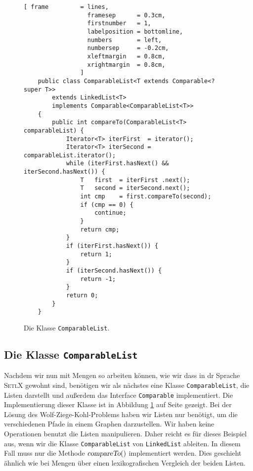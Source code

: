 \begin{figure}[!ht]
\centering
\begin{Verbatim}[ frame         = lines, 
                  framesep      = 0.3cm, 
                  firstnumber   = 1,
                  labelposition = bottomline,
                  numbers       = left,
                  numbersep     = -0.2cm,
                  xleftmargin   = 0.8cm,
                  xrightmargin  = 0.8cm,
                ]
    public class ComparableList<T extends Comparable<? super T>> 
        extends LinkedList<T>
        implements Comparable<ComparableList<T>>
    {
        public int compareTo(ComparableList<T> comparableList) { 
            Iterator<T> iterFirst  = iterator();
            Iterator<T> iterSecond = comparableList.iterator();
            while (iterFirst.hasNext() && iterSecond.hasNext()) {
                T   first  = iterFirst .next();
                T   second = iterSecond.next();
                int cmp    = first.compareTo(second);
                if (cmp == 0) {
                    continue;
                }
                return cmp;
            }
            if (iterFirst.hasNext()) {
                return 1;
            }       
            if (iterSecond.hasNext()) {
                return -1;
            }
            return 0;
        }
    }
\end{Verbatim}
\vspace*{-0.3cm}
\caption{Die Klasse \texttt{ComparableList}.}
\label{fig:ComparableList.java}
\end{figure}

\subsection{Die Klasse \texttt{ComparableList}}
Nachdem wir nun mit Mengen so arbeiten k\"onnen, wie wir dass in dr Sprache \textsc{SetlX} gewohnt sind,
ben\"otigen wir als n\"achstes eine Klasse \texttt{ComparableList}, die Listen darstellt und au{\ss}erdem das
Interface \texttt{Comparable} implementiert.  Die Implementierung dieser Klasse ist in Abbildung
\ref{fig:ComparableList.java} auf Seite \pageref{fig:ComparableList.java} gezeigt.  Bei der L\"osung des
Wolf-Ziege-Kohl-Problems haben wir Listen nur ben\"otigt, um die verschiedenen Pfade in einem Graphen
darzustellen.  Wir haben keine Operationen benutzt die Listen manipulieren.  Daher reicht es f\"ur dieses
Beispiel aus, wenn wir die Klasse \texttt{ComparableList} von \texttt{LinkedList} ableiten.  In diesem
Fall muss nur die Methode $\textsl{compareTo}()$ implementiert werden.  Dies geschieht \"ahnlich wie bei
Mengen \"uber einen lexikografischen Vergleich der beiden Listen.


